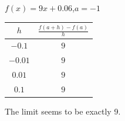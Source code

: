 {$f(x) = 9x+0.06$,\quad  $a=-1$}
{\begin{tabular}{cc}
$h$ & $\frac{f(a+h)-f(a)}{h}$\\ \hline 
 $-0.1$ & $9$ \\
 $-0.01$ & $9$ \\
 $0.01$ & $9$ \\
 $0.1$ & $9$
\end{tabular}

The limit seems to be exactly 9.
}

